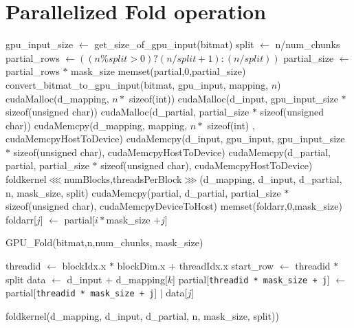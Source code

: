 \documentclass{article}
\begin{document}
\section*{Parallelized Fold operation}
\begin{algorithm}[H]
      \begin{algorithmic}[1]
      \STATE gpu\_input\_size $\gets$ get\_size\_of\_gpu\_input(bitmat)
      \STATE split $\gets$ n/num\_chunks
      \STATE partial\_rows $\gets ((n\%split > 0) ? (n/split + 1) : (n/split))$
      \STATE partial\_size $\gets$ partial\_rows $*$ mask\_size
      \STATE memset(partial,$0$,partial\_size)
      \STATE convert\_bitmat\_to\_gpu\_input(bitmat, gpu\_input, mapping, $n$)
      \STATE cudaMalloc(d\_mapping, $n *$ sizeof(int))
      \STATE cudaMalloc(d\_input, gpu\_input\_size $*$ sizeof(unsigned char))
      \STATE cudaMalloc(d\_partial, partial\_size $*$ sizeof(unsigned char))
      \STATE cudaMemcpy(d\_mapping, mapping, $n *$ sizeof(int) , cudaMemcpyHostToDevice)
      \STATE cudaMemcpy(d\_input, gpu\_input, gpu\_input\_size $*$ sizeof(unsigned char), cudaMemcpyHostToDevice)
      \STATE cudaMemcpy(d\_partial, partial, partial\_size $*$ sizeof(unsigned char), cudaMemcpyHostToDevice)
      \STATE foldkernel$\lll$numBlocks,threadsPerBlock$\ggg$(d\_mapping, d\_input, d\_partial, n, mask\_size, split)
      \STATE cudaMemcpy(partial, d\_partial, partial\_size $*$ sizeof(unsigned char), cudaMemcpyDeviceToHost)
      \STATE memset(foldarr,0,mask\_size)
                \STATE foldarr[$j$] $\gets$ partial[$i*$mask\_size $+j$]
            \ENDFOR
      \ENDFOR
      \end{algorithmic}
      \caption{GPU\_Fold(bitmat,n,num\_chunks, mask\_size)}
\end{algorithm}

\begin{algorithm}[H]
      \begin{algorithmic}[1]
      \STATE threadid $\gets$ blockIdx.x $*$ blockDim.x $+$ threadIdx.x
      \STATE start\_row $\gets$ threadid $*$ split
                \STATE data $\gets$ d\_input $+$ d\_mapping[$k$]
                    \STATE partial[\texttt{threadid * mask\_size + j}] $\gets $ partial[\texttt{threadid * mask\_size + j}] $\mathrel{|}$ data[$j$]
                \ENDFOR
            \ENDIF
      \ENDFOR
      \end{algorithmic}
      \caption{foldkernel(d\_mapping, d\_input, d\_partial, n, mask\_size, split))}
\end{algorithm}
\end{document}
